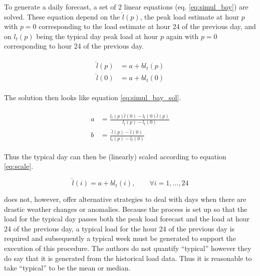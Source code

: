 \documentclass[a4paper]{article}
\begin{document}
To generate a daily forecast, a set of 2 linear equations (eq. \ref{eq:simul_bay}) are solved. These equation depend on the $\hat{l}(p)$, the peak load estimate at hour $p$ with $p=0$ corresponding to the load estimate at hour 24 of the previous day, and on $l_t(p)$ being the typical day peak load at hour $p$ again with $p=0$ corresponding to hour 24 of the previous day.

\begin{align} \label{eq:simul_bay}
\begin{split}
\hat{l}(p) &= a + bl_t(p) \\
\hat{l}(0) &= a + bl_t(0)
\end{split}
\end{align}

\noindent The solution then looks like equation \ref{eq:simul_bay_sol}.

\begin{align} \label{eq:simul_bay_sol}
\begin{split}
a &= \frac{l_t(p)\hat{l}(0) - l_t(0)\hat{l}(p)}{l_t(p) - l_t(0)} \\
b &= \frac{\hat{l}(p) - \hat{l}(0)}{l_t(p) - l_t(0)}
\end{split}
\end{align}

\noindent Thus the typical day can then be (linearly) scaled according to equation \ref{eq:scale}.

\begin{equation} \label{eq:scale}
\hat{l}(i) = a + bl_t(i), \qquad \forall i= 1,...,24
\end{equation}

\cite{douglas98} does not, however, offer alternative strategies to deal with days when there are drastic weather changes or anomalies. Because the process is set up so that the load for the typical day passes both the peak load forecast and the load at hour 24 of the previous day, a typical load for the hour 24 of the previous day is required and subsequently a typical week must be generated to support the execution of this procedure. The authors do not quantify ``typical'' however they do say that it is generated from the historical load data. Thus it is reasonable to take ``typical'' to be the mean or median.


\end{document}
